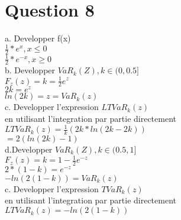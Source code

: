 \section{Question 8}

a. Developper f(x)\\
$\frac{1}{2}*e^{x}, x \le 0$\\
$\frac{1}{2}*e^{-x}, x \geq 0$\\

b. Developper $VaR_k(Z), k \in (0, 0.5]$\\
$F_z(z) = k = \frac{1}{2}e^z$\\
$2k = e^z$\\
$ln(2k) = z = VaR_k(z)$\\

c. Developper l'expression $LTVaR_k(z)$\\
en utilisant l'integration par partie directement\\
$LTVaR_k(z) = \frac{1}{k}(2k*ln(2k-2k))$\\
$ = 2(ln(2k)-1)$\\

d.Developper $VaR_k(Z), k \in (0.5, 1]$\\
 $F_z(z) = k = 1-\frac{1}{2}e^{-z}$\\
 $2*(1-k) = e^{-z}$\\
 $-ln(2(1-k)) =  VaR_k(z)$\\
 
 c. Developper l'expression $TVaR_k(z)$\\
 en utilisant l'integration par partie directement\\
 $LTVaR_k(z) = -ln(2(1-k))$\\
 